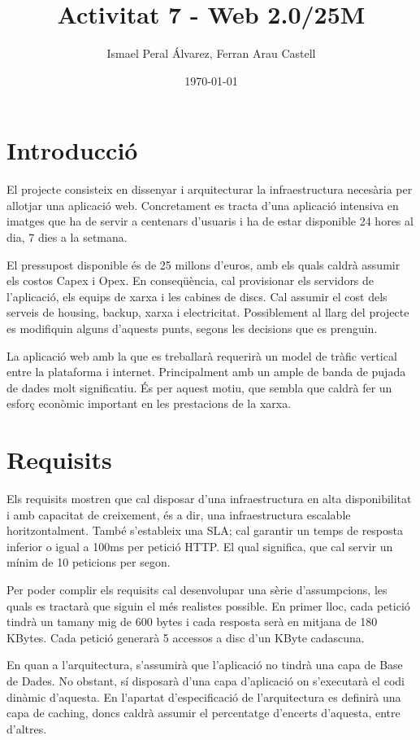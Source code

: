 \documentclass[a4paper, 11pt]{article}
\title{Activitat 7 - Web 2.0/25M}
\author{Ismael Peral Álvarez, Ferran Arau Castell}
\date{\today}
\begin{document}
\maketitle

\section{Introducció}

El projecte consisteix en dissenyar i arquitecturar la infraestructura necesària per allotjar una aplicació web. Concretament es tracta d'una aplicació intensiva en imatges que ha de servir a centenars d'usuaris i ha de estar disponible 24 hores al dia, 7 dies a la setmana.

El pressupost disponible és de 25 millons d'euros, amb els quals caldrà assumir els costos Capex i Opex. En conseqüència, cal provisionar els servidors de l'aplicació, els equips de xarxa i les cabines de discs. Cal assumir el cost dels serveis de housing, backup, xarxa i electricitat. Possiblement al llarg del projecte es modifiquin alguns d'aquests punts, segons les decisions que es prenguin.

La aplicació web amb la que es treballarà requerirà un model de tràfic vertical entre la plataforma i internet. Principalment amb un ample de banda de pujada de dades molt significatiu. És per aquest motiu, que sembla que caldrà fer un esforç econòmic important en les prestacions de la xarxa.


\section{Requisits}

Els requisits mostren que cal disposar d'una infraestructura en alta disponibilitat i amb capacitat de creixement, és a dir, una infraestructura escalable horitzontalment. També s'estableix una SLA; cal garantir un temps de resposta inferior o igual a 100ms per petició HTTP. El qual significa, que cal servir un mínim de 10 peticions per segon.

Per poder complir els requisits cal desenvolupar una sèrie d'assumpcions, les quals es tractarà que siguin el més realistes possible. En primer lloc, cada petició tindrà un tamany mig de 600 bytes i cada resposta serà en mitjana de 180 KBytes. Cada petició generarà 5 accessos a disc d'un KByte cadascuna.

En quan a l'arquitectura, s'assumirà que l'aplicació no tindrà una capa de Base de Dades. No obstant, sí disposarà d'una capa d'aplicació on s'executarà el codi dinàmic d'aquesta. En l'apartat d'especificació de l'arquitectura es definirà una capa de caching, doncs caldrà assumir el percentatge d'encerts d'aquesta, entre d'altres.
\end{document}
